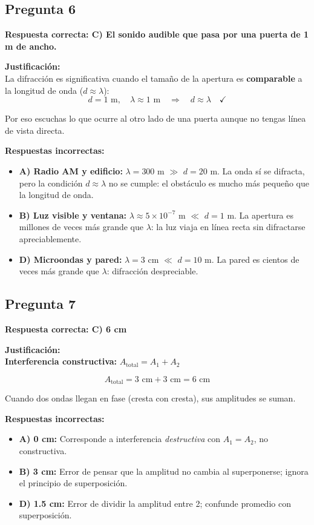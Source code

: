 \begin{respuestabox}
\subsection*{Pregunta 6}
\textcolor{verdecorrecto}{\textbf{Respuesta correcta: C) El sonido audible que pasa por una puerta de 1 m de ancho.}}

\textbf{Justificación:}\\
La difracción es significativa cuando el tamaño de la apertura es \textbf{comparable} a la longitud de onda ($d \approx \lambda$):
$$d = 1 \text{ m}, \quad \lambda \approx 1 \text{ m} \quad \Rightarrow \quad d \approx \lambda \quad \checkmark$$

Por eso escuchas lo que ocurre al otro lado de una puerta aunque no tengas línea de vista directa.

\textbf{Respuestas incorrectas:}
\begin{itemize}
    \item \textbf{A) Radio AM y edificio:} $\lambda = 300$ m $\gg$ $d = 20$ m. La onda sí se difracta, pero la condición $d \approx \lambda$ no se cumple: el obstáculo es mucho más pequeño que la longitud de onda.
    \item \textbf{B) Luz visible y ventana:} $\lambda \approx 5 \times 10^{-7}$ m $\ll$ $d = 1$ m. La apertura es millones de veces más grande que $\lambda$: la luz viaja en línea recta sin difractarse apreciablemente.
    \item \textbf{D) Microondas y pared:} $\lambda = 3$ cm $\ll$ $d = 10$ m. La pared es cientos de veces más grande que $\lambda$: difracción despreciable.
\end{itemize}
\end{respuestabox}

\begin{respuestabox}
\subsection*{Pregunta 7}
\textcolor{verdecorrecto}{\textbf{Respuesta correcta: C) 6 cm}}

\textbf{Justificación:}\\
\textbf{Interferencia constructiva:} $A_{\text{total}} = A_1 + A_2$

$$A_{\text{total}} = 3 \text{ cm} + 3 \text{ cm} = 6 \text{ cm}$$

Cuando dos ondas llegan en fase (cresta con cresta), sus amplitudes se suman.

\textbf{Respuestas incorrectas:}
\begin{itemize}
    \item \textbf{A) 0 cm:} Corresponde a interferencia \textit{destructiva} con $A_1 = A_2$, no constructiva.
    \item \textbf{B) 3 cm:} Error de pensar que la amplitud no cambia al superponerse; ignora el principio de superposición.
    \item \textbf{D) 1.5 cm:} Error de dividir la amplitud entre 2; confunde promedio con superposición.
\end{itemize}
\end{respuestabox}

